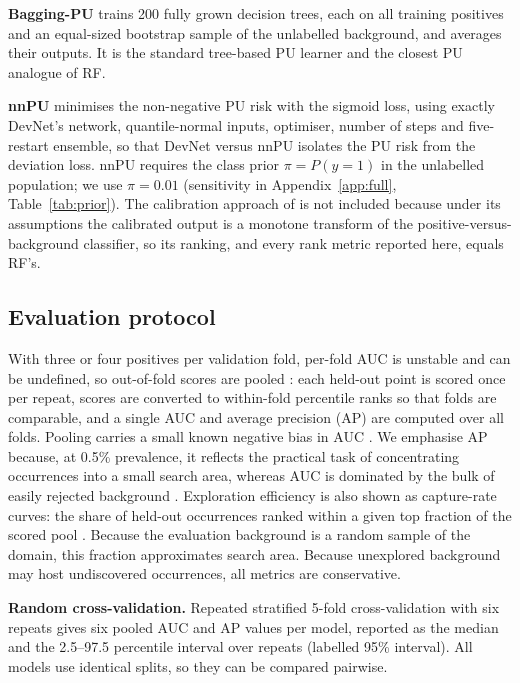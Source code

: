 \documentclass[pdflatex,sn-apa]{sn-jnl}
\begin{document}
\textbf{Bagging-PU} \citep{Mordelet2014} trains 200 fully grown decision trees, each on all training positives and an equal-sized bootstrap sample of the unlabelled background, and averages their outputs. It is the standard tree-based PU learner and the closest PU analogue of RF.

\textbf{nnPU} \citep{Kiryo2017} minimises the non-negative PU risk with the sigmoid loss, using exactly DevNet's network, quantile-normal inputs, optimiser, number of steps and five-restart ensemble, so that DevNet versus nnPU isolates the PU risk from the deviation loss. nnPU requires the class prior $\pi = P(y=1)$ in the unlabelled population; we use $\pi = 0.01$ (sensitivity in Appendix~\ref{app:full}, Table~\ref{tab:prior}). The calibration approach of \citet{Elkan2008} is not included because under its assumptions the calibrated output is a monotone transform of the positive-versus-background classifier, so its ranking, and every rank metric reported here, equals RF's.

\subsection{Evaluation protocol}\label{sec:protocol}

With three or four positives per validation fold, per-fold AUC is unstable and can be undefined, so out-of-fold scores are pooled \citep{BradleyAP1997}: each held-out point is scored once per repeat, scores are converted to within-fold percentile ranks so that folds are comparable, and a single AUC and average precision (AP) are computed over all folds. Pooling carries a small known negative bias in AUC \citep{Airola2019,Parker2007}. We emphasise AP because, at 0.5\% prevalence, it reflects the practical task of concentrating occurrences into a small search area, whereas AUC is dominated by the bulk of easily rejected background \citep{Saito2015}. Exploration efficiency is also shown as capture-rate curves: the share of held-out occurrences ranked within a given top fraction of the scored pool \citep{Chung2003,Agterberg2005}. Because the evaluation background is a random sample of the domain, this fraction approximates search area. Because unexplored background may host undiscovered occurrences, all metrics are conservative.

\textbf{Random cross-validation.} Repeated stratified 5-fold cross-validation with six repeats gives six pooled AUC and AP values per model, reported as the median and the 2.5--97.5 percentile interval over repeats (labelled 95\% interval). All models use identical splits, so they can be compared pairwise.
\end{document}
